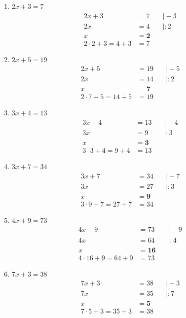 \documentclass[a4paper,10pt]{article} %
\begin{document}
\begin{enumerate}[label=\alph*)]

  \item \(2x + 3 = 7\)
  \[
  \begin{aligned}
    2x + 3 &= 7 &\quad\big| - 3 \\
    2x &= 4 &\quad\big| : 2 \\
    x &= \mathbf{2} \\
    2 \cdot 2 + 3 = 4 + 3 &= 7
  \end{aligned}
  \]

  \item \(2x + 5 = 19\)
  \[
  \begin{aligned}
    2x + 5 &= 19 &\quad\big| - 5 \\
    2x &= 14 &\quad\big| : 2 \\
    x &= \mathbf{7} \\
    2 \cdot 7 + 5 = 14 + 5 &= 19
  \end{aligned}
  \]

  \item \(3x + 4 = 13\)
  \[
  \begin{aligned}
    3x + 4 &= 13 &\quad\big| - 4 \\
    3x &= 9 &\quad\big| : 3 \\
    x &= \mathbf{3} \\
    3 \cdot 3 + 4 = 9 + 4 &= 13
  \end{aligned}
  \]

  \item \(3x + 7 = 34\)
  \[
  \begin{aligned}
    3x + 7 &= 34 &\quad\big| - 7 \\
    3x &= 27 &\quad\big| : 3 \\
    x &= \mathbf{9} \\
    3 \cdot 9 + 7 = 27 + 7 &= 34
  \end{aligned}
  \]

  \item \(4x + 9 = 73\)
  \[
  \begin{aligned}
    4x + 9 &= 73 &\quad\big| - 9 \\
    4x &= 64 &\quad\big| : 4 \\
    x &= \mathbf{16} \\
    4 \cdot 16 + 9 = 64 + 9 &= 73
  \end{aligned}
  \]

  \item \(7x + 3 = 38\)
  \[
  \begin{aligned}
    7x + 3 &= 38 &\quad\big| - 3 \\
    7x &= 35 &\quad\big| : 7 \\
    x &= \mathbf{5} \\
    7 \cdot 5 + 3 = 35 + 3 &= 38
  \end{aligned}
  \]


\end{enumerate}
\end{document}
